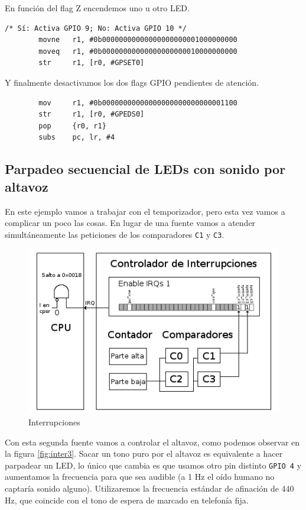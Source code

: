 En función del flag Z encendemos uno u otro LED.

\begin{lstlisting}
/* Sí: Activa GPIO 9; No: Activa GPIO 10 */
        movne   r1, #0b00000000000000000000001000000000
        moveq   r1, #0b00000000000000000000010000000000
        str     r1, [r0, #GPSET0]
\end{lstlisting}

Y finalmente desactivamos los dos flags GPIO pendientes de atención.

\begin{lstlisting}
        mov     r1, #0b00000000000000000000000000001100
        str     r1, [r0, #GPEDS0]
        pop     {r0, r1}
        subs    pc, lr, #4
\end{lstlisting}

\subsection{Parpadeo secuencial de LEDs con sonido por altavoz}

En este ejemplo vamos a trabajar con el temporizador, pero esta vez vamos a complicar
un poco las cosas. En lugar de una fuente vamos a atender simultáneamente las peticiones
de los comparadores {\tt C1} y {\tt C3}.

\begin{figure}[h]
  \centering
    \includegraphics[width=14cm]{graphs/inter4.png}
  \caption{Interrupciones}
  \label{fig:inter4}
\end{figure}

Con esta segunda fuente vamos a controlar el altavoz, como podemos
observar en la figura \ref{fig:inter3}. Sacar un tono
puro por el altavoz es equivalente a hacer parpadear un LED, lo único que cambia es que usamos
otro pin distinto {\tt GPIO 4} y aumentamos la frecuencia para que sea audible (a 1 Hz el oído
humano no captaría sonido alguno). Utilizaremos la frecuencia estándar de afinación
de 440 Hz, que coincide con el tono de espera de marcado en telefonía fija.

